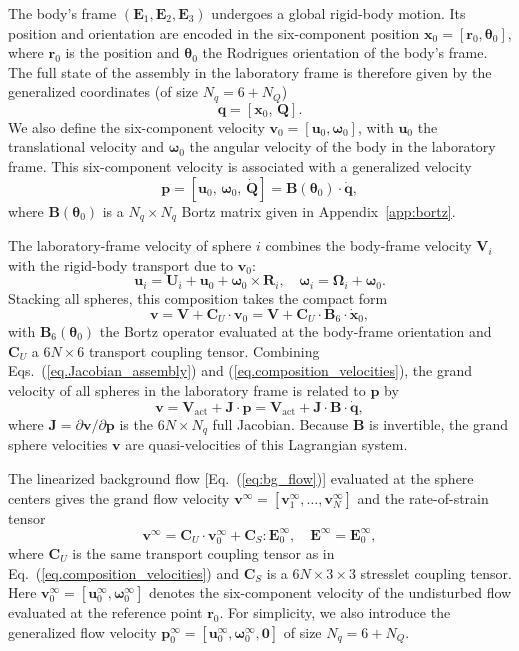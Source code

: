 \documentclass[aps,prfluids,groupedaddress]{revtex4-2}
\newcommand{\bp}{\bm{p}}
\newcommand{\bq}{\bm{q}}
\newcommand{\br}{\bm{r}}
\newcommand{\bu}{\bm{u}}
\newcommand{\bv}{\bm{v}}
\newcommand{\bx}{\bm{x}}
\newcommand{\bomega}{\bm{\omega}}
\newcommand{\btheta}{\bm{\theta}}
\newcommand{\bE}{\bm{E}}
\newcommand{\bQ}{\bm{Q}}
\newcommand{\bR}{\bm{R}}
\newcommand{\bU}{\bm{U}}
\newcommand{\bV}{\bm{V}}
\newcommand{\bOmega}{\bm{\Omega}}
\newcommand{\tB}{\bm{{B}}}
\newcommand{\tC}{\bm{{C}}}
\newcommand{\tE}{\bm{{E}}}
\newcommand{\tJ}{\bm{J}}
\newcommand{\bqd}{\bm{\dot q}}
\newcommand{\bQd}{\bm{{\dot Q}}}
\begin{document}
The body's frame $(\bE_1,\bE_2,\bE_3)$ undergoes a global rigid-body motion.
Its position and orientation are encoded in the six-component position $\bx_0 = [\br_0, \btheta_0]$, where $\br_0$ is the position and $\btheta_0$ the Rodrigues orientation of the body's frame. 
The full state of the assembly in the laboratory frame is therefore given by the generalized coordinates (of size $N_q = 6 + N_Q$)
\begin{equation}
\bq = \left[\bx_0,\, \bQ \right].
\end{equation}
We also define the six-component velocity $\bv_0 = [\bu_0, \bomega_0]$, with $\bu_0$ the translational velocity and $\bomega_0$ the angular velocity of the body in the laboratory frame. 
This six-component velocity is  associated with a generalized velocity
\begin{equation}
\bp = \left[\bu_0,\, \bomega_0,\, \bQd \right] = \tB(\btheta_0) \cdot \bqd,
\end{equation}
where $\tB(\btheta_0)$ is a $N_q\times N_q$ Bortz matrix given in Appendix~\ref{app:bortz}. 

The laboratory-frame velocity of sphere $i$ combines the body-frame velocity $\bV_i$ with the rigid-body transport due to $\bv_0$:
$$\bu_i = \bU_i + \bu_0 + \bomega_0 \times \bR_i, \quad \bomega_i = \bOmega_i + \bomega_0.$$
Stacking all spheres, this composition takes the compact form
\begin{equation}\label{eq.composition_velocities}
\bv = \bV + \tC_U \cdot \bv_0 = \bV + \tC_U \cdot \tB_6 \cdot \bm{\dot x}_0,
\end{equation}
with $\tB_6(\btheta_0)$ the Bortz operator evaluated at the body-frame orientation and $\tC_U$ a $6N\times 6$ transport coupling tensor. Combining Eqs.~(\ref{eq.Jacobian_assembly}) and (\ref{eq.composition_velocities}), the grand velocity of all spheres in the laboratory frame is related to $\bp$ by
\begin{equation}\label{eq.U_is_J_Qdot}
\bv = \bV_\mathrm{act} + \tJ \cdot \bp = \bV_\mathrm{act} + \tJ \cdot \tB \cdot \bqd,
\end{equation}
where $\tJ = \partial \bv/\partial \bp$ is the $6N\times N_q$ full Jacobian. Because $\tB$ is invertible, the grand sphere velocities $\bv$ are quasi-velocities of this Lagrangian system.

The linearized background flow [Eq.~(\ref{eq:bg_flow})] evaluated at the sphere centers gives the grand flow velocity $\bv^\infty = [\bv^\infty_1,\dots,\bv^\infty_N]$ and the rate-of-strain tensor
\begin{equation}\label{eq:grandflowvelocity}
\bv^\infty = \tC_U \cdot \bv_0^\infty + \tC_S : \tE_0^\infty, \quad \tE^\infty = \tE_0^\infty,
\end{equation}
where $\tC_U$ is the same transport coupling tensor as in Eq.~(\ref{eq.composition_velocities}) and $\tC_S$ is a $6N\times 3\times 3$ stresslet coupling tensor. Here $\bv_0^\infty = [\bu_0^\infty, \bomega_0^\infty]$ denotes the six-component velocity of the undisturbed flow evaluated at the reference point $\br_0$. For simplicity, we also introduce the generalized flow velocity $\bp_0^\infty = [\bu_0^\infty, \bomega_0^\infty, \mathbf{0}]$ of size $N_q=6+N_Q$. 
\end{document}
